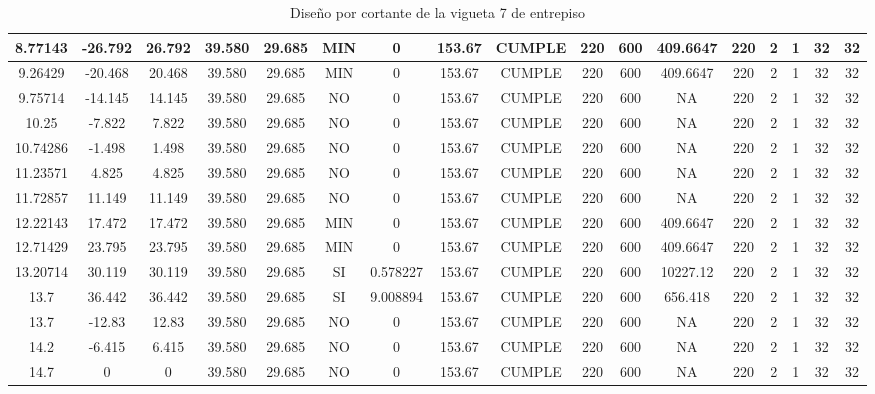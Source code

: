 \begin{table}[H]
{\begin{tabular}{|c|c|c|c|c|c|c|c|c|c|c|c|c|c|c|c|c|}
    \hline
    8.77143 & -26.792 & 26.792 & 39.580 & 29.685 & MIN & 0   & 153.67 & CUMPLE & 220 & 600 & 409.6647 & 220 & 2   & 1   & 32  & 32 \bigstrut\\
    \hline
    9.26429 & -20.468 & 20.468 & 39.580 & 29.685 & MIN & 0   & 153.67 & CUMPLE & 220 & 600 & 409.6647 & 220 & 2   & 1   & 32  & 32 \bigstrut\\
    \hline
    9.75714 & -14.145 & 14.145 & 39.580 & 29.685 & NO  & 0   & 153.67 & CUMPLE & 220 & 600 & NA  & 220 & 2   & 1   & 32  & 32 \bigstrut\\
    \hline
    10.25 & -7.822 & 7.822 & 39.580 & 29.685 & NO  & 0   & 153.67 & CUMPLE & 220 & 600 & NA  & 220 & 2   & 1   & 32  & 32 \bigstrut\\
    \hline
    10.74286 & -1.498 & 1.498 & 39.580 & 29.685 & NO  & 0   & 153.67 & CUMPLE & 220 & 600 & NA  & 220 & 2   & 1   & 32  & 32 \bigstrut\\
    \hline
    11.23571 & 4.825 & 4.825 & 39.580 & 29.685 & NO  & 0   & 153.67 & CUMPLE & 220 & 600 & NA  & 220 & 2   & 1   & 32  & 32 \bigstrut\\
    \hline
    11.72857 & 11.149 & 11.149 & 39.580 & 29.685 & NO  & 0   & 153.67 & CUMPLE & 220 & 600 & NA  & 220 & 2   & 1   & 32  & 32 \bigstrut\\
    \hline
    12.22143 & 17.472 & 17.472 & 39.580 & 29.685 & MIN & 0   & 153.67 & CUMPLE & 220 & 600 & 409.6647 & 220 & 2   & 1   & 32  & 32 \bigstrut\\
    \hline
    12.71429 & 23.795 & 23.795 & 39.580 & 29.685 & MIN & 0   & 153.67 & CUMPLE & 220 & 600 & 409.6647 & 220 & 2   & 1   & 32  & 32 \bigstrut\\
    \hline
    13.20714 & 30.119 & 30.119 & 39.580 & 29.685 & SI  & 0.578227 & 153.67 & CUMPLE & 220 & 600 & 10227.12 & 220 & 2   & 1   & 32  & 32 \bigstrut\\
    \hline
    13.7 & 36.442 & 36.442 & 39.580 & 29.685 & SI  & 9.008894 & 153.67 & CUMPLE & 220 & 600 & 656.418 & 220 & 2   & 1   & 32  & 32 \bigstrut\\
    \hline
    13.7 & -12.83 & 12.83 & 39.580 & 29.685 & NO  & 0   & 153.67 & CUMPLE & 220 & 600 & NA  & 220 & 2   & 1   & 32  & 32 \bigstrut\\
    \hline
    14.2 & -6.415 & 6.415 & 39.580 & 29.685 & NO  & 0   & 153.67 & CUMPLE & 220 & 600 & NA  & 220 & 2   & 1   & 32  & 32 \bigstrut\\
    \hline
    14.7 & 0   & 0   & 39.580 & 29.685 & NO  & 0   & 153.67 & CUMPLE & 220 & 600 & NA  & 220 & 2   & 1   & 32  & 32 \bigstrut\\
    \hline
    \end{tabular}}%
    \caption{Diseño por cortante de la vigueta 7 de entrepiso}
  \label{tab:CORT VT7 EP}%
\end{table}%
